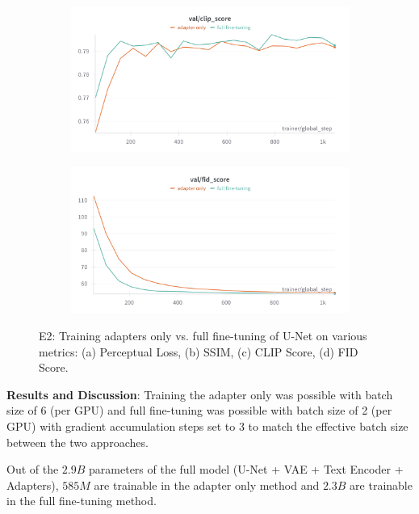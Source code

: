 \begin{figure}[htbp]
  \begin{subfigure}[b]{0.48\textwidth}
    \centering
    \includegraphics[width=\textwidth]{images/experiments/adapter_vs_full/clip_score.png}
    \label{fig:exp_adap_vs_full_clip}
  \end{subfigure}
  \hfill
  \begin{subfigure}[b]{0.48\textwidth}
    \centering
    \includegraphics[width=\textwidth]{images/experiments/adapter_vs_full/fid.png}
    \label{fig:exp_adap_vs_full_train_loss}
  \end{subfigure}

  \caption{E2: Training adapters only vs. full fine-tuning of U-Net on various metrics: (a) Perceptual Loss, (b) SSIM, (c) CLIP Score, (d) FID Score.}
  \label{fig:exp_adap_vs_full_metrics_grid}
\end{figure}

\textbf{Results and Discussion}:
Training the adapter only was possible with batch size of 6 (per GPU) and full fine-tuning was possible with batch size of 2 (per GPU) with gradient accumulation steps set to 3 to match the effective batch size between the two approaches.

Out of the $2.9B$ parameters of the full model (U-Net + VAE + Text Encoder + Adapters), $585M$ are trainable in the adapter only method and $2.3B$ are trainable in the full fine-tuning method.

